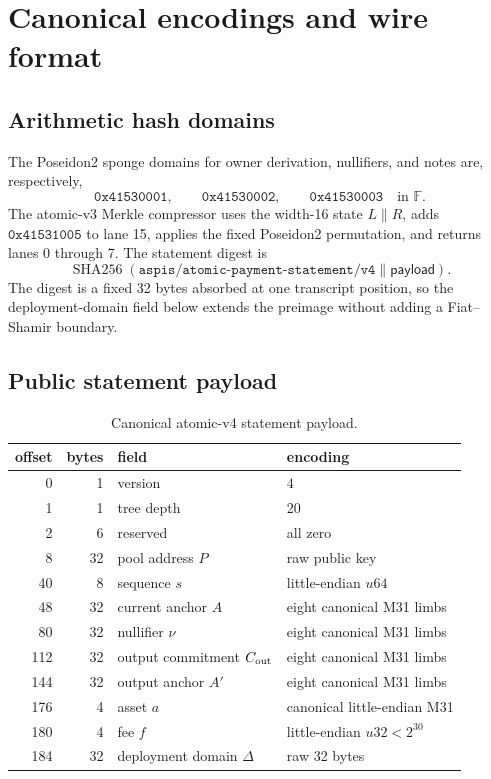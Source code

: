 \section{Canonical encodings and wire format}
\label{app:wire}

\subsection{Arithmetic hash domains}

The Poseidon2 sponge domains for owner derivation, nullifiers, and notes are,
respectively,
\[
 \mathtt{0x41530001},\qquad
 \mathtt{0x41530002},\qquad
 \mathtt{0x41530003}
 \quad\text{in }\mathbb F.
\]
The atomic-v3 Merkle compressor uses the width-16 state
\(L\|R\), adds \(\mathtt{0x41531005}\) to lane 15, applies the fixed
Poseidon2 permutation, and returns lanes 0 through 7.  The statement digest is
\[
 \operatorname{SHA256}(
   \mathtt{aspis/atomic\mbox{-}payment\mbox{-}statement/v4}\|\mathsf{payload}).
\]
The digest is a fixed 32 bytes absorbed at one transcript position, so the
deployment-domain field below extends the preimage without adding a
Fiat--Shamir boundary.

\subsection{Public statement payload}

\begin{table}[ht]
\centering
\caption{Canonical atomic-v4 statement payload.}
\label{tab:statement-wire-appendix}
\begin{tabular}{@{}rrll@{}}
\toprule
offset & bytes & field & encoding \\
\midrule
0 & 1 & version & \(4\) \\
1 & 1 & tree depth & \(20\) \\
2 & 6 & reserved & all zero \\
8 & 32 & pool address \(P\) & raw public key \\
40 & 8 & sequence \(s\) & little-endian \(u64\) \\
48 & 32 & current anchor \(A\) & eight canonical M31 limbs \\
80 & 32 & nullifier \(\nu\) & eight canonical M31 limbs \\
112 & 32 & output commitment \(C_{\rm out}\) & eight canonical M31 limbs \\
144 & 32 & output anchor \(A'\) & eight canonical M31 limbs \\
176 & 4 & asset \(a\) & canonical little-endian M31 \\
180 & 4 & fee \(f\) & little-endian \(u32<2^{30}\) \\
184 & 32 & deployment domain \(\Delta\) & raw 32 bytes \\
\bottomrule
\end{tabular}
\end{table}

